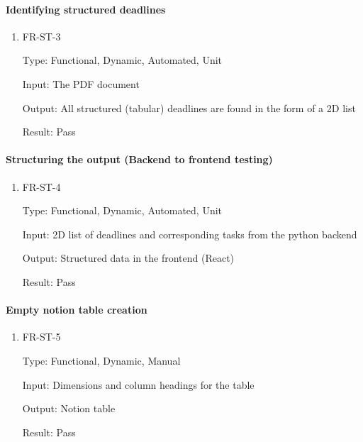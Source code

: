\documentclass[12pt, titlepage]{article}
\begin{document}
\paragraph{Identifying structured deadlines}

\begin{enumerate}

\item{FR-ST-3\\}

Type: Functional, Dynamic, Automated, Unit 

Input: The PDF document 

Output: All structured (tabular) deadlines are found in the form of a 2D list 

Result: Pass

\end{enumerate}

\paragraph{Structuring the output (Backend to frontend testing)}

\begin{enumerate}

\item{FR-ST-4\\}

Type: Functional, Dynamic, Automated, Unit 

Input: 2D list of deadlines and corresponding tasks from the python backend 

Output: Structured data in the frontend (React) 

Result: Pass

\end{enumerate}

\paragraph{Empty notion table creation}

\begin{enumerate}

\item{FR-ST-5\\}

Type: Functional, Dynamic, Manual 

Input: Dimensions and column headings for the table 

Output: Notion table 

Result: Pass

\end{enumerate}
\end{document}
